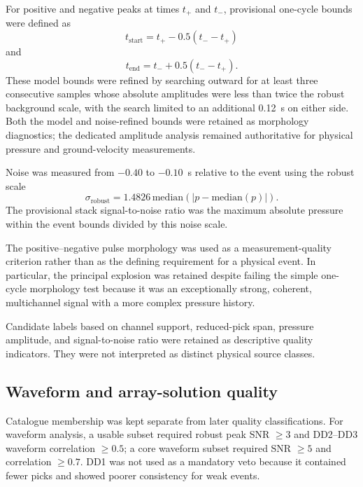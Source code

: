 \documentclass[]{seismica}
\begin{document}
For positive and negative peaks at times $t_+$ and $t_-$, provisional one-cycle bounds were defined as
\begin{equation}
  t_{\mathrm{start}} = t_+ - 0.5(t_- - t_+)
  \label{eq:pulse_start}
\end{equation}
and
\begin{equation}
  t_{\mathrm{end}} = t_- + 0.5(t_- - t_+).
  \label{eq:pulse_end}
\end{equation}
These model bounds were refined by searching outward for at least three
consecutive samples whose absolute amplitudes were less than twice the robust
background scale, with the search limited to an additional 0.12~s on either
side. Both the model and noise-refined bounds were retained as morphology
diagnostics; the dedicated amplitude analysis remained authoritative for
physical pressure and ground-velocity measurements.

Noise was measured from $-0.40$ to $-0.10$~s relative to the event using the robust scale
\begin{equation}
  \sigma_{\mathrm{robust}} = 1.4826\,\mathrm{median}\left(\left|p-\mathrm{median}(p)\right|\right).
  \label{eq:robust_noise}
\end{equation}
The provisional stack signal-to-noise ratio was the maximum absolute pressure within the event bounds divided by this noise scale.

The positive--negative pulse morphology was used as a measurement-quality criterion rather than as the defining requirement for a physical event. In particular, the principal explosion was retained despite failing the simple one-cycle morphology test because it was an exceptionally strong, coherent, multichannel signal with a more complex pressure history.

Candidate labels based on channel support, reduced-pick span, pressure amplitude, and signal-to-noise ratio were retained as descriptive quality indicators. They were not interpreted as distinct physical source classes.

\subsection{Waveform and array-solution quality}

Catalogue membership was kept separate from later quality classifications.
For waveform analysis, a usable subset required robust peak SNR $\geq3$ and
DD2--DD3 waveform correlation $\geq0.5$; a core waveform subset required SNR
$\geq5$ and correlation $\geq0.7$. DD1 was not used as a mandatory veto
because it contained fewer picks and showed poorer consistency for weak
events.
\end{document}
